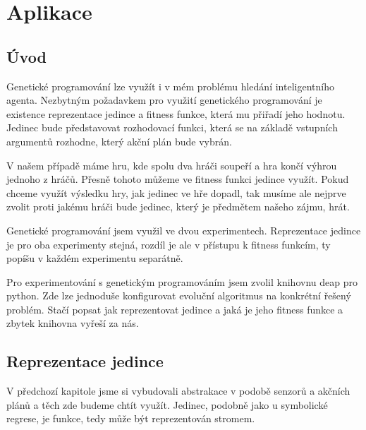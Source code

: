\section{Aplikace}
\subsection{Úvod}
Genetické programování lze využít i v mém problému hledání inteligentního agenta. 
Nezbytným požadavkem pro využití genetického programování je existence reprezentace jedince a fitness funkce, která mu přiřadí jeho hodnotu. 
Jedinec bude představovat rozhodovací funkci, která se na základě vstupních argumentů rozhodne, který akční plán bude vybrán.

V našem případě máme hru, kde spolu dva hráči soupeří a hra končí výhrou jednoho z hráčů.
Přesně tohoto můžeme ve fitness funkci jedince využít. 
Pokud chceme využít výsledku hry, jak jedinec ve hře dopadl, tak musíme ale nejprve zvolit proti jakému hráči bude jedinec, který je předmětem našeho zájmu, hrát.

Genetické programování jsem využil ve dvou experimentech. 
Reprezentace jedince je pro oba experimenty stejná, rozdíl je ale v přístupu k fitness funkcím, ty popíšu v každém experimentu separátně.

Pro experimentování s genetickým programováním jsem zvolil knihovnu deap pro python. Zde lze jednoduše konfigurovat evoluční algoritmus na konkrétní řešený problém.
Stačí popsat jak reprezentovat jedince a jaká je jeho fitness funkce a zbytek knihovna vyřeší za nás.


\subsection{Reprezentace jedince}
V předchozí kapitole jsme si vybudovali abstrakace v podobě senzorů a akčních plánů a těch zde budeme chtít využít.
Jedinec, podobně jako u symbolické regrese, je funkce, tedy může být reprezentován stromem.

